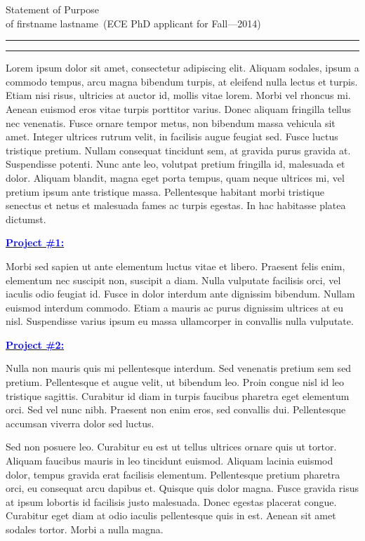 \documentclass{article}
\newcommand{\soptitle}{Statement of Purpose}
\newcommand{\yourname}{firstname lastname}
\newcommand{\statement}[1]{\par\medskip
  \underline{\textcolor{blue}{\textbf{#1:}}}\space
}
\begin{document}
\begin{center}\LARGE\soptitle\\
\large of \yourname\ (ECE PhD applicant for Fall---2014)
\end{center}

\hrule
\vspace{1pt}
\hrule height 1pt

\bigskip

Lorem ipsum dolor sit amet, consectetur adipiscing elit. Aliquam
sodales, ipsum a commodo tempus, arcu magna bibendum turpis, at
eleifend nulla lectus et turpis. Etiam nisi risus, ultricies at auctor
id, mollis vitae lorem. Morbi vel rhoncus mi. Aenean euismod eros
vitae turpis porttitor varius. Donec aliquam fringilla tellus nec
venenatis. Fusce ornare tempor metus, non bibendum massa vehicula sit
amet. Integer ultrices rutrum velit, in facilisis augue feugiat sed.
Fusce luctus tristique pretium. Nullam consequat tincidunt sem, at
gravida purus gravida at. Suspendisse potenti. Nunc ante leo, volutpat
pretium fringilla id, malesuada et dolor. Aliquam blandit, magna eget
porta tempus, quam neque ultrices mi, vel pretium ipsum ante tristique
massa. Pellentesque habitant morbi tristique senectus et netus et
malesuada fames ac turpis egestas. In hac habitasse platea dictumst.

\statement{Project \#1}
Morbi sed sapien ut ante elementum luctus vitae et libero. Praesent
felis enim, elementum nec suscipit non, suscipit a diam. Nulla
vulputate facilisis orci, vel iaculis odio feugiat id. Fusce in dolor
interdum ante dignissim bibendum. Nullam euismod interdum commodo.
Etiam a mauris ac purus dignissim ultrices at eu nisl. Suspendisse
varius ipsum eu massa ullamcorper in convallis nulla vulputate.

\statement{Project \#2}
Nulla non mauris quis mi pellentesque interdum. Sed venenatis pretium
sem sed pretium. Pellentesque et augue velit, ut bibendum leo. Proin
congue nisl id leo tristique sagittis. Curabitur id diam in turpis
faucibus pharetra eget elementum orci. Sed vel nunc nibh. Praesent non
enim eros, sed convallis dui. Pellentesque accumsan viverra dolor sed
luctus.

Sed non posuere leo. Curabitur eu est ut tellus ultrices ornare quis
ut tortor. Aliquam faucibus mauris in leo tincidunt euismod. Aliquam
lacinia euismod dolor, tempus gravida erat facilisis elementum.
Pellentesque pretium pharetra orci, eu consequat arcu dapibus et.
Quisque quis dolor magna. Fusce gravida risus at ipsum lobortis id
facilisis justo malesuada. Donec egestas placerat congue. Curabitur
eget diam at odio iaculis pellentesque quis in est. Aenean sit amet
sodales tortor. Morbi a nulla magna.
\end{document}
